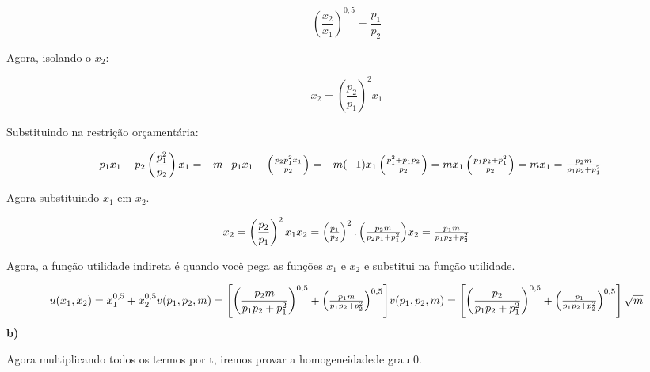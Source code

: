 \documentclass[a4paper, 12pt]{article} %
\begin{document}
\begin{flushleft}
\begin{equation}
	\left( \frac{x_{2}}{x_{1}} \right)^{0,5} = \frac{p_{1}}{p_{2}}
\end{equation}

\begin{center}
	Agora, isolando o $x_{2}$:

\end{center}

\begin{equation}
	x_{2} = \left( \frac{p_{2}}{p_{1}} \right)^{2}x_{1}
\end{equation}

\begin{center}
	Substituindo na restrição orçamentária:
\end{center}

\begin{equation}
	-p_{1}x_{1} - p_{2} \left( \frac{p_{1}^{2}}{p_{2}}\right)x_{1} = -m
	$$\\$$
	-p_{1}x_{1} - \left( \frac{p_{2}p_{1}^{2}x_{1}}{p_{2}} \right) = -m (-1)
	$$\\$$
	x_{1}\left( \frac{p_{1}^{2} + p_{1}p_{2}}{p_{2}} \right) = m
	$$\\$$
	x_{1}\left(\frac{p_{1}p_{2} + p_{1}^{2}}{p_{2}}\right) = m
	$$\\$$
	x_{1} = \frac{p_{2}m}{p_{1}p_{2} + p_{1}^{2}}
\end{equation}

\begin{center}
	Agora substituindo $x_{1}$ em $x_{2}$.
\end{center}

\begin{equation}
	x_{2} = \left( \frac{p_{2}}{p_{1}} \right)^{2}x_{1}
	$$\\$$
	x_{2} = \left( \frac{p_{1}}{p_{2}} \right)^{2}.\left( \frac{p_{2}m}{p_{2}p_{1} + p_{1}^{2}} \right)
	$$\\$$
	x_{2} = \frac{p_{1}m}{p_{1}p_{2} + p_{2}^{2}}
\end{equation}

\begin{center}
	Agora, a função utilidade indireta é quando você pega as funções $x_{1}$ e $x_{2}$ e substitui na função utilidade.
\end{center}

\begin{equation}
	u(x_{1},x_{2}) = x_{1}^{0,5} + x_{2}^{0,5}
	$$\\$$
	v(p_{1},p_{2},m) = \left[ \left( \dfrac{p_{2}m}{p_{1}p_{2} + p_{1}^{2}} \right)^{0,5} + \left( \frac{p_{1}m}{p_{1}p_{2} + p_{2}^{2}} \right)^{0,5}  \right] 
	$$\\$$
	v(p_{1},p_{2},m) = \left[ \left( \dfrac{p_{2}}{p_{1}p_{2} + p_{1}^{2}} \right)^{0,5} + \left( \frac{p_{1}}{p_{1}p_{2} + p_{2}^{2}} \right)^{0,5}  \right] \sqrt{m}
\end{equation}
\singlespacing
\textbf{b)}
	\begin{center}
		Agora multiplicando todos os termos por t, iremos provar a homogeneidadede grau 0.
	\end{center}


\end{flushleft}
\end{document}
